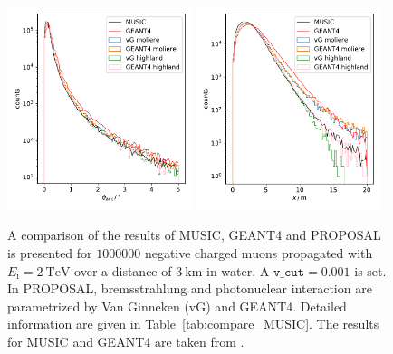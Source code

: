 \begin{figure}
    \centering
        {\includegraphics[width=0.48\textwidth]{figures/compare_MUSIC_angle_paper.pdf}}
        {\includegraphics[width=0.48\textwidth]{figures/compare_MUSIC_dist_paper.pdf}}
    \caption{A comparison of the results of MUSIC, GEANT4 and PROPOSAL is presented for $\num{1000000}$ negative charged muons propagated with 
    $E_{\text{i}} = \SI{2}{\tera\electronvolt}$ over a distance of 
    $\SI{3}{\kilo\meter}$ in water. A $\texttt{v\_cut} = 0.001$ is set. In PROPOSAL, 
    bremsstrahlung and photonuclear interaction are parametrized by 
    Van Ginneken (vG) and GEANT4. Detailed information are given in 
    Table~\ref{tab:compare_MUSIC}. The results for MUSIC and GEANT4 are taken from 
    \cite{comparison_MUSIC_GEANT4_2009}.}
    \label{fig:compare_MUSIC}
\end{figure}



